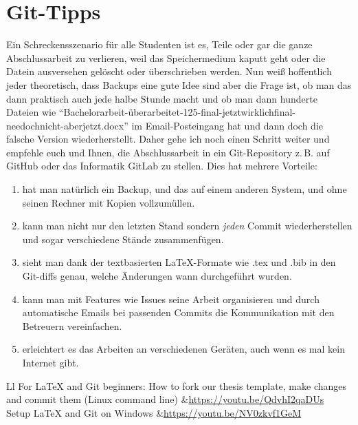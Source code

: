 \chapter{Git-Tipps}
Ein Schreckensszenario für alle Studenten ist es, Teile oder gar die ganze Abschlussarbeit zu verlieren, weil das Speichermedium kaputt geht oder die Datein ausversehen gelöscht oder überschrieben werden.
Nun weiß hoffentlich jeder theoretisch, dass Backups eine gute Idee sind aber die Frage ist, ob man das dann praktisch auch jede halbe Stunde macht und ob man dann hunderte Dateien wie \enquote{Bachelorarbeit-überarbeitet-125-final-jetztwirklichfinal-needochnicht-aberjetzt.docx} im Email-Posteingang hat und dann doch die falsche Version wiederherstellt.
Daher gehe ich noch einen Schritt weiter und empfehle euch und Ihnen, die Abschlussarbeit in ein Git-Repository z.\,B. auf GitHub oder das Informatik GitLab zu stellen.
Dies hat mehrere Vorteile:

\begin{enumerate}
\item hat man natürlich ein Backup, und das auf einem anderen System, und ohne seinen Rechner mit Kopien vollzumüllen.
\item kann man nicht nur den letzten Stand sondern \emph{jeden} Commit wiederherstellen und sogar verschiedene Stände zusammenfügen.
\item sieht man dank der textbasierten LaTeX-Formate wie .tex und .bib in den Git-diffs genau, welche Änderungen wann durchgeführt wurden.
\item kann man mit Features wie Issues seine Arbeit organisieren und durch automatische Emails bei passenden Commits die Kommunikation mit den Betreuern vereinfachen.
\item erleichtert es das Arbeiten an verschiedenen Geräten, auch wenn es mal kein Internet gibt.
\end{enumerate}

\begin{table}[h]
\begin{tabulary}{\textwidth}{Ll}
For LaTeX and Git beginners: How to fork our thesis template, make changes and commit them (Linux command line)	&\url{https://youtu.be/QdvhI2qaDUs}\\
Setup LaTeX and Git on Windows	&\url{https://youtu.be/NV0zkvf1GeM}\\
\end{tabulary}
\caption{Videos zu Git und LaTeX.}
\end{table}

